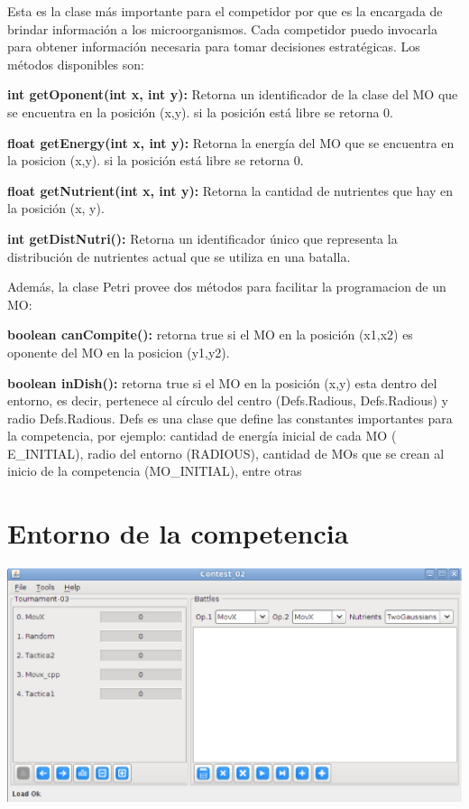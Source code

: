 \documentclass[11pt,a4paper]{article}
\begin{document}
Esta es la clase más importante para el competidor por que es la encargada de brindar información a los microorganismos. Cada competidor puedo invocarla para obtener información necesaria para tomar decisiones estratégicas. Los métodos disponibles son:

{\bf int getOponent(int x, int y):} Retorna un identificador de la clase del MO que se encuentra en la posición (x,y). si la posición está libre se retorna 0.

{\bf float getEnergy(int x, int y):} Retorna la energía del MO que se encuentra en la posicion (x,y). si la posición está libre se retorna 0.

{\bf float getNutrient(int x, int y):} Retorna la cantidad de nutrientes que hay en la posición (x, y).

{\bf int getDistNutri():} Retorna un identificador único que representa la distribución de nutrientes actual que se utiliza en una batalla.

Además, la clase Petri provee dos métodos para facilitar la programacion de un MO:

{\bf boolean canCompite():} retorna true si el MO en la posición (x1,x2) es oponente del MO en la posicion (y1,y2).

{\bf boolean inDish():} retorna true si el MO en la posición (x,y) esta dentro del entorno, es decir, pertenece al círculo del centro (Defs.Radious, Defs.Radious) y radio Defs.Radious. Defs es una clase que define las constantes importantes para la competencia, por ejemplo: cantidad de energía inicial de cada MO  ( E\_INITIAL),  radio del entorno (RADIOUS), cantidad de MOs que se crean al inicio de la competencia (MO\_INITIAL), entre otras

\section{Entorno de la competencia}

\includegraphics[scale=0.5]{frameppal}\\
\end{document}
